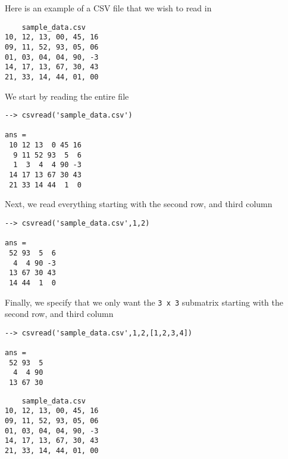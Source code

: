 Here is an example of a CSV file that we wish to read in
\begin{verbatim}
    sample_data.csv
10, 12, 13, 00, 45, 16
09, 11, 52, 93, 05, 06
01, 03, 04, 04, 90, -3
14, 17, 13, 67, 30, 43
21, 33, 14, 44, 01, 00
\end{verbatim}
We start by reading the entire file
\begin{verbatim}
--> csvread('sample_data.csv')

ans = 
 10 12 13  0 45 16 
  9 11 52 93  5  6 
  1  3  4  4 90 -3 
 14 17 13 67 30 43 
 21 33 14 44  1  0 
\end{verbatim}
Next, we read everything starting with the second row, and third column
\begin{verbatim}
--> csvread('sample_data.csv',1,2)

ans = 
 52 93  5  6 
  4  4 90 -3 
 13 67 30 43 
 14 44  1  0 
\end{verbatim}
Finally, we specify that we only want the \verb|3 x 3| submatrix starting
with the second row, and third column
\begin{verbatim}
--> csvread('sample_data.csv',1,2,[1,2,3,4])

ans = 
 52 93  5 
  4  4 90 
 13 67 30 
\end{verbatim}
\begin{verbatim}
    sample_data.csv
10, 12, 13, 00, 45, 16
09, 11, 52, 93, 05, 06
01, 03, 04, 04, 90, -3
14, 17, 13, 67, 30, 43
21, 33, 14, 44, 01, 00
\end{verbatim}
